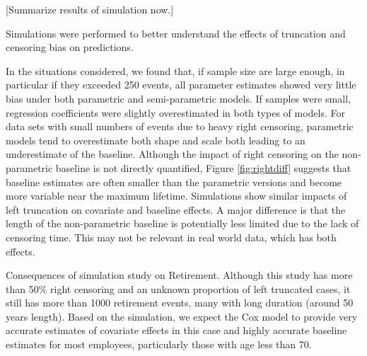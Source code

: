 \documentclass[12pt,letterpaper]{article}
\begin{document}
[Summarize results of simulation now.]

Simulations were performed to better understand the effects of truncation and censoring bias on predictions.

In the situations considered, we found that, if sample size are large enough, in particular if they exceeded 250 events, all parameter estimates showed very little bias under both parametric and semi-parametric models.  If samples were small, regression coefficients were slightly overestimated in both types of models.  For data sets with small numbers of events due to heavy right censoring, parametric models tend to overestimate both shape and scale both leading to an underestimate of the baseline.  Although the impact of right censoring on the non-parametric baseline is not directly quantified, Figure \ref{fig:rightdiff} suggests that baseline estimates are often smaller than the parametric versions and become more variable near the maximum lifetime.  Simulations show similar impacts of left truncation on covariate and baseline effects.  A major difference is that the length of the non-parametric baseline is potentially less limited due to the lack of censoring time.  This may not be relevant in real world data, which has both effects.

Consequences of simulation study on Retirement.  Although this study has more than 50\% right censoring and an unknown proportion of left truncated cases, it still has more than 1000 retirement events, many with long duration (around 50 years length). Based on the simulation, we expect the Cox model to provide very accurate estimates of covariate effects in this case and highly accurate baseline estimates for most employees, particularly those with age less than 70.


\cite{}%
%
\end{document}
